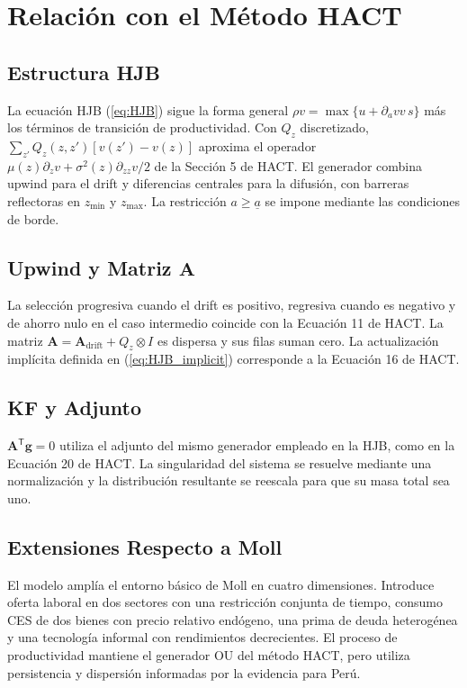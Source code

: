 \documentclass[12pt]{article}
\newcommand{\dVa}{\partial_a v}
\newcommand{\abar}{\underline{a}}
\begin{document}
\section{Relación con el Método HACT}

\subsection{Estructura HJB}

La ecuación HJB (\ref{eq:HJB}) sigue la forma general $\rho v=\max\{u+\dVa v\,s\}$ más los términos de transición de productividad. Con $Q_z$ discretizado, $\sum_{z'}Q_z(z,z')[v(z')-v(z)]$ aproxima el operador $\mu(z)\partial_zv+\sigma^2(z)\partial_{zz}v/2$ de la Sección 5 de HACT. El generador combina upwind para el drift y diferencias centrales para la difusión, con barreras reflectoras en $z_{\min}$ y $z_{\max}$. La restricción $a\geq\abar$ se impone mediante las condiciones de borde.

\subsection{Upwind y Matriz $\mathbf{A}$}

La selección progresiva cuando el drift es positivo, regresiva cuando es negativo y de ahorro nulo en el caso intermedio coincide con la Ecuación 11 de HACT. La matriz $\mathbf A=\mathbf A_{\mathrm{drift}}+Q_z\otimes I$ es dispersa y sus filas suman cero. La actualización implícita definida en (\ref{eq:HJB_implicit}) corresponde a la Ecuación 16 de HACT.

\subsection{KF y Adjunto}

$\mathbf A^{\mathsf T}\mathbf g=0$ utiliza el adjunto del mismo generador empleado en la HJB, como en la Ecuación 20 de HACT. La singularidad del sistema se resuelve mediante una normalización y la distribución resultante se reescala para que su masa total sea uno.

\subsection{Extensiones Respecto a Moll}

El modelo amplía el entorno básico de Moll en cuatro dimensiones. Introduce oferta laboral en dos sectores con una restricción conjunta de tiempo, consumo CES de dos bienes con precio relativo endógeno, una prima de deuda heterogénea y una tecnología informal con rendimientos decrecientes. El proceso de productividad mantiene el generador OU del método HACT, pero utiliza persistencia y dispersión informadas por la evidencia para Perú.
\end{document}
